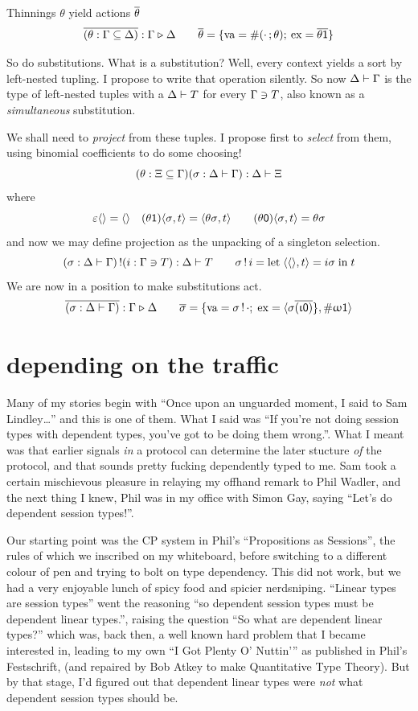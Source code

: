 \documentclass{book}
\newcommand{\C}[1]{\red{\ensuremath{\mathsf{#1}}}}
\newcommand{\F}[1]{\green{\ensuremath{\mathrm{#1}}}}
\newcommand{\N}[1]{\black{\ensuremath{#1}}}
\newcommand{\lett}[3]{\mathrm{let}\;#1 = #2\;\mathrm{in}\; #3}
\newcommand{\vd}{\C{\langle\rangle}}
\newcommand{\pr}[2]{\red{\langle\N{#1},\N{#2}\rangle}}
\begin{document}
\newcommand{\act}[1]{\green{\overline{\N{#1}}}}
Thinnings $\theta$ yield actions $\act{\theta}$
\[
\act{(\theta:\Gamma\thin\Delta)} : \Gamma\tma\Delta
\qquad
\act{\theta} = \{\F{va} = \va{(\cdot\thc\theta)};\:\F{ex} = \act{\theta\thi}\}
\]

So do substitutions. What is a substitution? Well, every context yields a sort by left-nested tupling. I propose to write that operation silently. So now $\Delta\tm\Gamma$ is the type of left-nested tuples with a $\Delta\tm T$ for every $\Gamma\vni T$, also known as a \emph{simultaneous} substitution.

We shall need to \emph{project} from these tuples. I propose first to \emph{select} from them, using binomial coefficients to do some choosing!
\[
(\theta:\Xi\thin\Gamma)(\sigma:\Delta\tm\Gamma) : \Delta\tm\Xi
\]
where
\[
\emp\vd = \vd \quad
(\theta\thi)\pr{\sigma}{t} = \pr{\theta\sigma}{t} \qquad
(\theta\tho)\pr{\sigma}{t} = \theta\sigma
\]
and now we may define projection as the unpacking of a singleton selection.
\newcommand{\prj}{\mathop{\green{\F{!}}}}
\[
(\sigma:\Delta\tm\Gamma)\prj(i:\Gamma\vni T) : \Delta\tm T \qquad
\sigma\prj i = \lett{\pr{\vd}{t}}{i\sigma}{t}
\]
We are now in a position to make substitutions act.
\[
\act{(\sigma:\Delta\tm\Gamma)} : \Gamma\tma\Delta \qquad
\act{\sigma} = \{\F{va} = \sigma\prj\cdot;\;\F{ex} = \pr{\sigma\act{(\thii\tho)}\}}{\va{\thoo\thi}}
\]



\chapter{depending on the traffic}

Many of my stories begin with ``Once upon an unguarded moment, I said to Sam Lindley\ldots'' and this is one of them. What I said was ``If you're not doing session types with dependent types, you've got to be doing them wrong.''. What I meant was that earlier signals \emph{in} a protocol can determine the later stucture \emph{of} the protocol, and that sounds pretty fucking dependently typed to me. Sam took a certain mischievous pleasure in relaying my offhand remark to Phil Wadler, and the next thing I knew, Phil was in my office with Simon Gay, saying ``Let's do dependent session types!''.

Our starting point was the CP system in Phil's ``Propositions as Sessions'', the rules of which we inscribed on my whiteboard, before switching to a different colour of pen and trying to bolt on type dependency. This did not work, but we had a very enjoyable lunch of spicy food and spicier nerdsniping. ``Linear types are session types'' went the reasoning ``so dependent session types must be dependent linear types.'', raising the question ``So what are dependent linear types?'' which was, back then, a well known hard problem that I became interested in, leading to my own ``I Got Plenty O' Nuttin'{}'' as published in Phil's Festschrift, (and repaired by Bob Atkey to make Quantitative Type Theory). But by that stage, I'd figured out that dependent linear types were \emph{not} what dependent session types should be.
\end{document}

